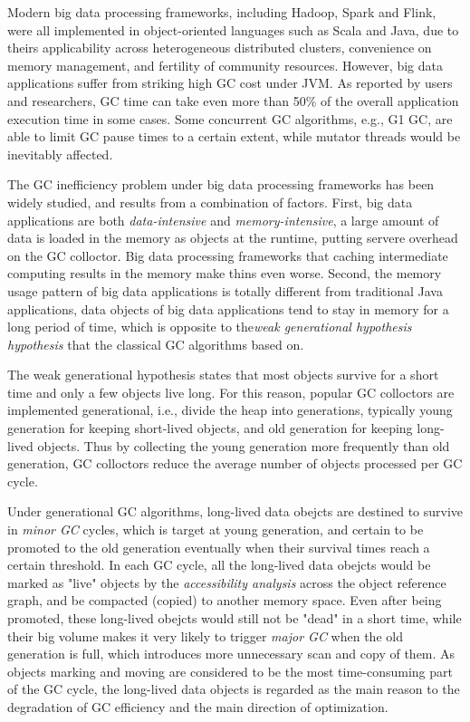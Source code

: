 \documentclass[sigplan, screen]{acmart}
\begin{document}
Modern big data processing frameworks, including Hadoop, Spark\cite{zaharia2010spark} and
Flink\cite{carbone2015apache}, were all implemented in object-oriented languages such as Scala and Java, due to 
theirs applicability across heterogeneous distributed clusters, convenience on memory management, and fertility 
of community resources. However, big data applications suffer from striking high GC cost under JVM. As reported by users and researchers,
GC time can take even more than 50$\%$ of the overall application execution time in some cases\cite{stackoverflow, bu2013bloat}.
Some concurrent GC algorithms, e.g., G1 GC\cite{detlefs2004garbage}, are able to limit GC pause times to a certain extent, 
while mutator threads would be inevitably affected\cite{xu2019experimental, wu2020platinum}.

The GC inefficiency problem under big data processing frameworks has been widely studied\cite{xu2019experimental,bruno2018study,gidra2013study}, 
and results from a combination of factors. First, big data applications are both \emph{data-intensive} and \emph{memory-intensive}, a large amount of data 
is loaded in the memory as objects at the runtime, putting servere overhead on the GC colloctor. Big data processing frameworks that caching intermediate 
computing results in the memory make thins even worse.
 Second, the memory usage pattern of big data applications is totally different from traditional Java applications, data objects of big data applications tend to stay in memory
 for a long period of time, which is opposite to the\emph{weak generational hypothesis hypothesis}\cite{weakgenerational} that the classical GC algorithms based on.
 
The weak generational hypothesis states that most objects survive for a short time and only a few objects live long. For this reason, popular GC colloctors
are implemented generational, i.e., divide the heap into generations, typically young generation for keeping short-lived objects, and old
generation for keeping long-lived objects. Thus by collecting the young generation more frequently than old generation, GC colloctors reduce the average number of objects 
processed per GC cycle. 

Under generational GC algorithms, long-lived data obejcts are destined to survive in \emph{minor GC} cycles, which is target at young generation,
and certain to be promoted to the old generation eventually when their survival times reach a certain threshold. In each GC cycle, all the long-lived data obejcts would be marked
as "live" objects by the \emph{accessibility analysis} across the object reference graph, and be compacted (copied) to another memory space. Even after being promoted, these
long-lived obejcts would still not be "dead" in a short time, while their big volume makes it very likely to trigger \emph{major GC} when the old generation is full, 
which introduces more unnecessary scan and copy of them. 
As objects marking and moving are considered to be the most time-consuming part of the GC cycle\cite{suo2018characterizing,yu2016performance}, the long-lived data objects is regarded
as the main reason to the degradation of GC efficiency and the main direction of optimization.
\end{document}
